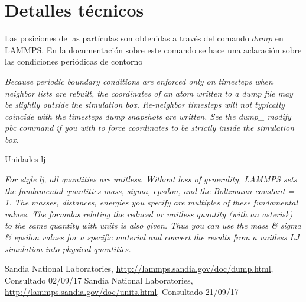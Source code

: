 \documentclass[
 reprint,
 amsmath,amssymb,
 aps,
 a4paper
]{revtex4-1}
\begin{document}
\section{\label{seq:details}Detalles técnicos}
Las posiciones de las partículas son obtenidas a través del comando $dump$ en LAMMPS. En la documentación\cite{dumplammps} sobre este comando se hace una aclaración sobre las condiciones periódicas de contorno
\begin{framed}
\textit{Because periodic boundary conditions are enforced only on timesteps when neighbor lists are rebuilt, the coordinates of an atom written to a dump file may be slightly outside the simulation box. Re-neighbor timesteps will not typically coincide with the timesteps dump snapshots are written. See the dump\_ modify pbc command if you with to force coordinates to be strictly inside the simulation box.}
\end{framed}
Unidades lj \cite{unitslammps}
\begin{framed}
\textit{For style lj, all quantities are unitless. Without loss of generality, LAMMPS sets the fundamental quantities mass, sigma, epsilon, and the Boltzmann constant = 1. The masses, distances, energies you specify are multiples of these fundamental values. The formulas relating the reduced or unitless quantity (with an asterisk) to the same quantity with units is also given. Thus you can use the mass \& sigma \& epsilon values for a specific material and convert the results from a unitless LJ simulation into physical quantities.}

\end{framed}

\begin{thebibliography}{9}

  Sandia National Laboratories,
  \url{http://lammps.sandia.gov/doc/dump.html},
  Consultado 02/09/17
  Sandia National Laboratories,
  \url{http://lammps.sandia.gov/doc/units.html},
  Consultado 21/09/17

\end{thebibliography}
\end{document}
